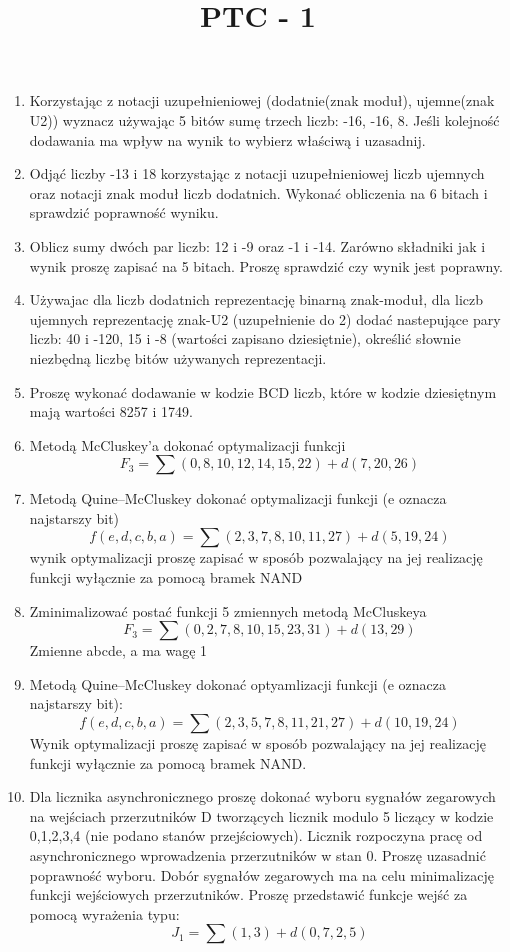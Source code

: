 \documentclass[a4paper]{article}
\author{}
\title{PTC - 1}
\date{}
\begin{document}
\maketitle
\begin{enumerate}
\item Korzystając z notacji uzupełnieniowej (dodatnie(znak moduł), ujemne(znak U2)) wyznacz używając 5 bitów sumę trzech liczb: -16, -16, 8. Jeśli kolejność dodawania ma wpływ na wynik to wybierz właściwą i uzasadnij.
\item Odjąć liczby -13 i 18 korzystając z notacji uzupełnieniowej liczb ujemnych oraz notacji znak moduł liczb dodatnich. Wykonać obliczenia na 6 bitach i sprawdzić poprawność wyniku.
\item Oblicz sumy dwóch par liczb: 12 i -9 oraz -1 i -14. Zarówno składniki jak i wynik proszę zapisać na 5 bitach. Proszę sprawdzić czy wynik jest poprawny.
\item Używajac dla liczb dodatnich reprezentację binarną znak-moduł, dla liczb ujemnych reprezentację znak-U2 (uzupełnienie do 2) dodać nastepujące pary liczb: 40 i -120, 15 i -8 (wartości zapisano dziesiętnie), określić słownie niezbędną liczbę bitów używanych reprezentacji.
\item Proszę wykonać dodawanie w kodzie BCD liczb, które w kodzie dziesiętnym mają wartości 8257 i 1749.
\item Metodą McCluskey'a dokonać optymalizacji funkcji $$F_3 = \sum (0,8,10,12,14,15,22) + d(7,20,26)$$
\item Metodą Quine--McCluskey dokonać optymalizacji funkcji (e oznacza najstarszy bit) $$ f(e,d,c,b,a) = \sum (2,3,7,8,10,11,27)+d(5,19,24) $$ wynik optymalizacji proszę zapisać w sposób pozwalający na jej realizację funkcji wyłącznie za pomocą bramek NAND
\item Zminimalizować postać funkcji 5 zmiennych metodą McCluskeya $$ F_3 = \sum (0,2,7,8,10,15,23,31)+d(13,29) $$ Zmienne abcde, a ma wagę 1
\item Metodą Quine--McCluskey dokonać optyamlizacji funkcji (e oznacza najstarszy bit): $$f(e,d,c,b,a)=\sum (2,3,5,7,8,11,21,27) + d(10,19,24)$$ Wynik optymalizacji proszę zapisać w sposób pozwalający na jej realizację funkcji wyłącznie za pomocą bramek NAND.
\item Dla licznika asynchronicznego proszę dokonać wyboru sygnałów zegarowych na wejściach przerzutników D tworzących licznik modulo 5 liczący w kodzie 0,1,2,3,4 (nie podano stanów przejściowych). Licznik rozpoczyna pracę od asynchronicznego wprowadzenia przerzutników w stan 0. Proszę uzasadnić poprawność wyboru. Dobór sygnałów zegarowych ma na celu minimalizację funkcji wejściowych przerzutników. Proszę przedstawić funkcje wejść za pomocą wyrażenia typu: $$J_1 = \sum (1,3) + d(0,7,2,5)$$

\end{enumerate}
\end{document}
